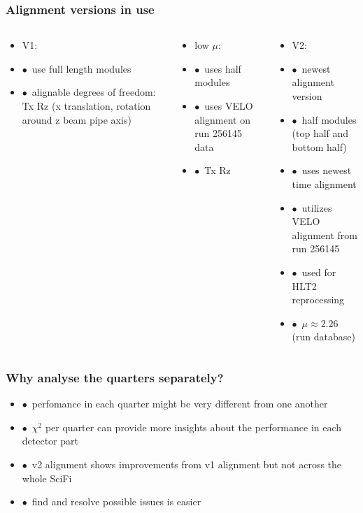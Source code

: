 \documentclass[aspectratio=1610, 12pt]{beamer}
\begin{document}
\begin{frame}\frametitle{Alignment versions in use}
  \begin{columns}
    \begin{column}[c]{0.33\textwidth}
      \begin{itemize}
        \item V1:
        \item $\bullet$\, use full length modules
        \item $\bullet$\, alignable degrees of freedom: Tx Rz (x translation, rotation around z \to beam pipe axis)
      \end{itemize}
    \end{column}
    \begin{column}[c]{0.33\textwidth}
      \begin{itemize}
        \item low $\mu$:
        \item $\bullet$\, uses half modules
        \item $\bullet$\, uses VELO alignment on run 256145 data
        \item $\bullet$\, Tx Rz
      \end{itemize}
    \end{column}
    \begin{column}[c]{0.33\textwidth}
      \begin{itemize}
        \item V2:
        \item $\bullet$\, newest alignment version
        \item $\bullet$\, half modules (top half and bottom half)
        \item $\bullet$\, uses newest time alignment
        \item $\bullet$\, utilizes VELO alignment from run 256145
        \item $\bullet$\, used for HLT2 reprocessing
        \item $\bullet$\, $\mu \approx 2.26$ (run database)
      \end{itemize}
    \end{column}
  \end{columns}
\end{frame}

\begin{frame}\frametitle{Why analyse the quarters separately?}
  \begin{itemize}
    \item $\bullet$\, perfomance in each quarter might be very different from one another
    \item $\bullet$\, \to $\chi^2$ per quarter can provide more insights about the performance in each detector part
    \item $\bullet$\, v2 alignment shows improvements from v1 alignment but not across the whole SciFi
    \item $\bullet$\, find and resolve possible issues is easier
  \end{itemize}
\end{frame}
\end{document}
